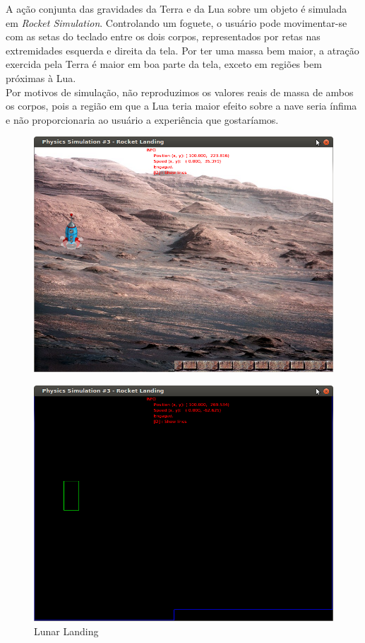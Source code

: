 A ação conjunta das gravidades da Terra e da Lua sobre um objeto é simulada em \textit{Rocket Simulation}. Controlando um foguete, o usuário pode movimentar-se com as setas do teclado entre os dois corpos, representados por retas nas extremidades esquerda e direita da tela. Por ter uma massa bem maior, a atração exercida pela Terra é maior em boa parte da tela, exceto em regiões bem próximas à Lua. \\

Por motivos de simulação, não reproduzimos os valores reais de massa de ambos os corpos, pois a região em que a Lua teria maior efeito sobre a nave seria ínfima e não proporcionaria ao usuário a experiência que gostaríamos. \\

\begin{figure}[H]
\centering
	\includegraphics[scale=0.4]{images/lunarLanding.png}
\end{figure}
\begin{figure}[H]
\centering
	\includegraphics[scale=0.4]{images/lunarLandingE.png}
	\caption{Lunar Landing}
\end{figure}

